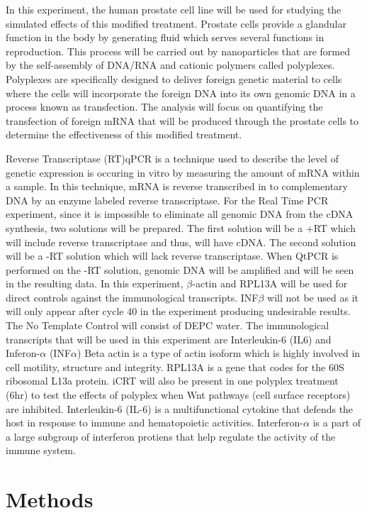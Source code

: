 \documentclass[journal, a4paper]{IEEEtran}
\begin{document}
  In this experiment, the human prostate cell line will be used for studying the simulated effects of this modified treatment. Prostate cells provide a glandular function
  in the body by generating fluid which serves several functions in reproduction.
  This process will be carried out by nanoparticles that are formed by the self-assembly of DNA/RNA and cationic polymers
  called polyplexes. Polyplexes are specifically designed to deliver foreign genetic material to cells where the cells will incorporate
  the foreign DNA into its own genomic DNA in a process known as transfection.
  The analysis will focus on quantifying the transfection of foreign
  mRNA that will be produced through the prostate cells to determine the effectiveness of this modified treatment.

  Reverse Transcriptase (RT)qPCR is a technique used to describe the level of genetic expression is occuring in vitro
  by measuring the amount of mRNA within a sample. In this technique, mRNA is reverse transcribed in to complementary DNA by
  an enzyme labeled reverse transcriptase.
  For the Real Time PCR experiment, since it is impossible to eliminate all genomic DNA from the cDNA synthesis, two solutions will be prepared.
  The first solution will be a +RT which will include reverse transcriptase and thus, will have cDNA.
  The second solution will be a -RT solution which will lack reverse transcriptase.
  When QtPCR is performed on the -RT solution, genomic DNA will be amplified and will be seen in the resulting data.
  In this experiment, $\beta$-actin and RPL13A will be used for direct controls against the immunological transcripts.
  INF$\beta$ will not be used as it will only appear after cycle 40 in the experiment producing undesirable results.
  The No Template Control will consist of DEPC water.
  The immunological transcripts that will be used in this experiment are Interleukin-6 (IL6) and Inferon-$\alpha$ (INF$\alpha$)
  Beta actin is a type of actin isoform which is highly involved in cell motility, structure and integrity.
  RPL13A is a gene that codes for the 60S ribosomal L13a protein. iCRT will also be present in one polyplex treatment (6hr)
  to test the effects of polyplex when Wnt pathways (cell surface receptors) are inhibited.
  Interleukin-6 (IL-6) is a multifunctional cytokine that defends the host in response to immune and hematopoietic activities.
  Interferon-$\alpha$ is a part of a large subgroup of interferon protiens that help regulate the activity of the immune system.

\section{Methods}
\end{document}
